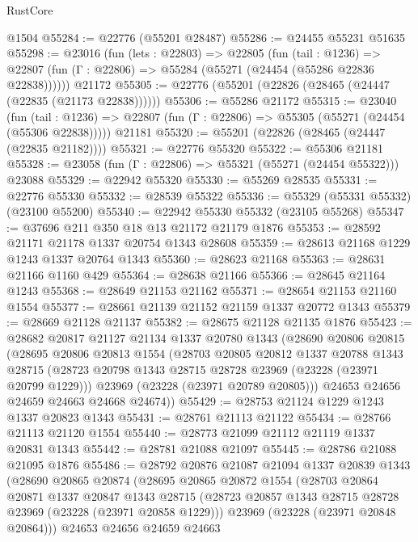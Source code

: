 \begin{lexlean}{RustCore}
\begin{coremodule}
    @1504
@55284 := @22776 (@55201 @28487)
@55286 := @24455 @55231 @51635
@55298 := @23016
    (fun (lets : @22803) =>
    @22805
      (fun (tail : @1236) =>
      @22807 (fun (Γ : @22806) => @55284 (@55271 (@24454 (@55286 @22836 @22838))))))
    @21172
@55305 := @22776 (@55201 (@22826 (@28465 (@24447 (@22835 (@21173 @22838))))))
@55306 := @55286 @21172
@55315 := @23040
    (fun (tail : @1236) => @22807 (fun (Γ : @22806) => @55305 (@55271 (@24454 (@55306 @22838)))))
    @21181
@55320 := @55201 (@22826 (@28465 (@24447 (@22835 @21182))))
@55321 := @22776 @55320
@55322 := @55306 @21181
@55328 := @23058 (fun (Γ : @22806) => @55321 (@55271 (@24454 @55322))) @23088
@55329 := @22942 @55320
@55330 := @55269 @28535
@55331 := @22776 @55330
@55332 := @28539 @55322
@55336 := @55329 (@55331 @55332) (@23100 @55200)
@55340 := @22942 @55330 @55332 (@23105 @55268)
@55347 := @37696 @211 @350 @18 @13 @21172 @21179 @1876
@55353 := @28592 @21171 @21178 @1337 @20754 @1343 @28608
@55359 := @28613 @21168 @1229 @1243 @1337 @20764 @1343
@55360 := @28623 @21168
@55363 := @28631 @21166 @1160 @429
@55364 := @28638 @21166
@55366 := @28645 @21164 @1243
@55368 := @28649 @21153 @21162
@55371 := @28654 @21153 @21160 @1554
@55377 := @28661 @21139 @21152 @21159 @1337 @20772 @1343
@55379 := @28669 @21128 @21137
@55382 := @28675 @21128 @21135 @1876
@55423 := @28682
    @20817
    @21127
    @21134
    @1337
    @20780
    @1343
    (@28690
      @20806
      @20815
      (@28695
        @20806
        @20813
        @1554
        (@28703
          @20805
          @20812
          @1337
          @20788
          @1343
          @28715
          (@28723 @20798 @1343 @28715 @28728 @23969 (@23228 (@23971 @20799 @1229)))
          @23969
          (@23228 (@23971 @20789 @20805)))
        @24653
        @24656
        @24659
        @24663
        @24668
        @24674))
@55429 := @28753 @21124 @1229 @1243 @1337 @20823 @1343
@55431 := @28761 @21113 @21122
@55434 := @28766 @21113 @21120 @1554
@55440 := @28773 @21099 @21112 @21119 @1337 @20831 @1343
@55442 := @28781 @21088 @21097
@55445 := @28786 @21088 @21095 @1876
@55486 := @28792
    @20876
    @21087
    @21094
    @1337
    @20839
    @1343
    (@28690
      @20865
      @20874
      (@28695
        @20865
        @20872
        @1554
        (@28703
          @20864
          @20871
          @1337
          @20847
          @1343
          @28715
          (@28723 @20857 @1343 @28715 @28728 @23969 (@23228 (@23971 @20858 @1229)))
          @23969
          (@23228 (@23971 @20848 @20864)))
        @24653
        @24656
        @24659
        @24663

\end{coremodule}
\end{lexlean}
